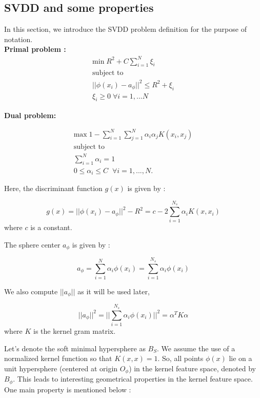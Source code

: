 \documentclass{article}
\begin{document}
\subsection{SVDD and some properties}
In this section, we introduce the SVDD problem definition for the purpose of notation. \\[10pt]

\textbf{Primal problem :}
\begin{equation}
\begin{split}
\text{min} \; R^2 + C \sum\limits_{i=1}^N \xi_i \\
\text{subject to}\\
||\phi(x_i) - a_{\phi}||^2  \leq R^2 + \xi_i \\
\xi_i \geq 0 \; \forall i = 1,...N
\end{split}
\end{equation}

\textbf{Dual problem:}

\begin{equation}
\begin{split}
\text{max}\; 1 - \sum\limits_{i=1}^N \sum\limits_{j=1}^N \alpha_i \alpha_j K(x_i,x_j) \\
\text{subject to}  \\
\sum\limits_{i = 1}^N \alpha_i  = 1  \\
0 \leq \alpha_i \leq C \;\; \forall  i = 1,...,N.  
\end{split}
\end{equation}


Here, the discriminant function $g(x)$ is given by :

\[ g(x) = ||\phi(x_i) - a_{\phi}||^2 - R^2 = c - 2 \sum\limits_{i=1}^{N_s}\alpha_i K(x,x_i) \]
where $c$ is a constant.

The sphere center $a_\phi$ is given by :

\[ a_\phi  = \sum\limits_{i=1}^{N} \alpha_i \phi(x_i) = \sum\limits_{i=1}^{N_s} \alpha_i \phi(x_i)\]

We also compute $||a_\phi||$ as it will be used later, 

\[||a_\phi||^2 = ||\sum\limits_{i=1}^{N_s} \alpha_i \phi(x_i) ||^2  = \alpha^T K \alpha\]
where $K$ is the kernel gram matrix.


Let's denote the soft minimal hypersphere as $B_S$. We assume the use of a normalized kernel function so that $K(x,x) = 1$. So, all points $\phi(x)$ lie on a unit hypersphere (centered at origin $O_\phi$) in the kernel feature space, denoted by $B_\phi$. This leads to interesting geometrical properties in the kernel feature space. One main property is mentioned below : \\[10pt]
\end{document}
